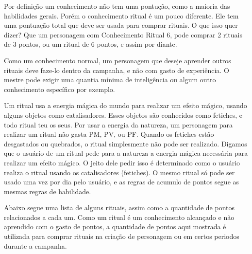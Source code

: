 Por definição um conhecimento não tem uma pontução, como a maioria das habilidades gerais. Porém o conhecimento ritual é um pouco diferente. Ele tem uma pontuação total que deve ser usada para comprar rituais. O que isso quer dizer? Que um personagem com Conhecimento Ritual 6, pode comprar 2 rituais de 3 pontos, ou um ritual de 6 pontos, e assim por diante.

Como um conhecimento normal, um personagem que deseje aprender outros rituais deve faze-lo dentro da campanha, e não com gasto de experiência. O mestre pode exigir uma quantia mínima de inteligência ou algum outro conhecimento específico por exemplo.

Um ritual usa a energia mágica do mundo para realizar um efeito mágico, usando alguns objetos como catalisadores. Esses objetos são conhecidos como fetiches, e todo ritual teu os seus. Por usar a energia da natureza, um personagem para realizar um ritual não gasta PM, PV, ou PF. Quando os fetiches estão desgastados ou quebrados, o ritual simplesmente não pode ser realizado. Digamos que o usuário de um ritual pede para a natureza a energia mágica necessária para realizar um efeito mágico. O jeito dele pedir isso é determinado como o usuário realiza o ritual usando os catalisadores (fetiches). O mesmo ritual só pode ser usado uma vez por dia  pelo usuário, e as regras de acumulo de pontos segue as mesmas regras de habilidade.
 
Abaixo segue uma lista de alguns rituais, assim como a quantidade de pontos relacionados a cada um. Como um ritual é um conhecimento alcançado e não aprendido com o gasto de pontos, a quantidade de pontos aqui mostrada é utilizada para comprar rituais na criação de personagem ou em certos periodos durante a campanha. 

